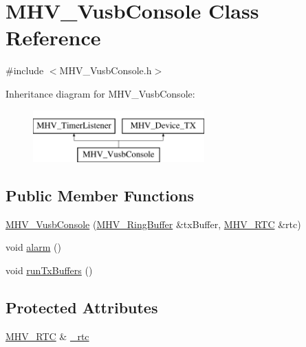 \hypertarget{class_m_h_v___vusb_console}{
\section{\-M\-H\-V\-\_\-\-Vusb\-Console \-Class \-Reference}
\label{class_m_h_v___vusb_console}
}


{\ttfamily \#include $<$\-M\-H\-V\-\_\-\-Vusb\-Console.\-h$>$}

\-Inheritance diagram for \-M\-H\-V\-\_\-\-Vusb\-Console\-:\begin{figure}[H]
\begin{center}
\leavevmode
\includegraphics[height=2.000000cm]{class_m_h_v___vusb_console}
\end{center}
\end{figure}
\subsection*{\-Public \-Member \-Functions}
\begin{DoxyCompactItemize}
\item 
\hyperlink{class_m_h_v___vusb_console_a1731128afca55ab0450da54b7d2568a6}{\-M\-H\-V\-\_\-\-Vusb\-Console} (\hyperlink{class_m_h_v___ring_buffer}{\-M\-H\-V\-\_\-\-Ring\-Buffer} \&tx\-Buffer, \hyperlink{class_m_h_v___r_t_c}{\-M\-H\-V\-\_\-\-R\-T\-C} \&rtc)
\item 
void \hyperlink{class_m_h_v___vusb_console_af2e1ca4fd0700cc6692807b9bcc5e227}{alarm} ()
\item 
void \hyperlink{class_m_h_v___vusb_console_a00956c69813f5a0cbdf0a5cb0555bbbf}{run\-Tx\-Buffers} ()
\end{DoxyCompactItemize}
\subsection*{\-Protected \-Attributes}
\begin{DoxyCompactItemize}
\item 
\hyperlink{class_m_h_v___r_t_c}{\-M\-H\-V\-\_\-\-R\-T\-C} \& \hyperlink{class_m_h_v___vusb_console_a0ccd1ee48d53ee1871f8d1d1ba068825}{\-\_\-rtc}
\end{DoxyCompactItemize}


